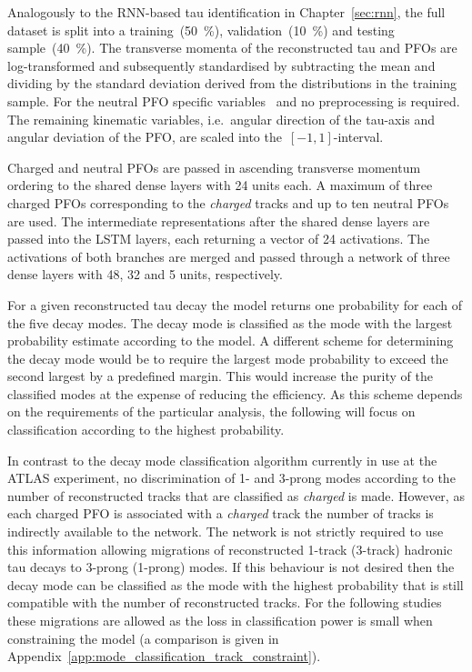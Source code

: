 Analogously to the RNN-based tau identification in Chapter~\ref{sec:rnn}, the
full dataset is split into a training~(\SI{50}{\percent}),
validation~(\SI{10}{\percent}) and testing sample~(\SI{40}{\percent}). The
transverse momenta of the reconstructed tau and PFOs are log-transformed and
subsequently standardised by subtracting the mean and dividing by the standard
deviation derived from the distributions in the training sample. For the neutral
PFO specific variables~ and
 no preprocessing is required. The remaining kinematic
variables, i.e.\ angular direction of the tau-axis and angular deviation of the
PFO, are scaled into the~$[-1, 1]$-interval.

Charged and neutral PFOs are passed in ascending transverse momentum ordering to
the shared dense layers with 24 units each. A maximum of three charged PFOs
corresponding to the \emph{charged} tracks and up to ten neutral PFOs are used.
The intermediate representations after the shared dense layers are passed into
the LSTM layers, each returning a vector of 24 activations. The activations of
both branches are merged and passed through a network of three dense layers with
48, 32 and 5 units, respectively.

For a given reconstructed tau decay the model returns one probability for each
of the five decay modes. The decay mode is classified as the mode with the
largest probability estimate according to the model. A different scheme for
determining the decay mode would be to require the largest mode probability to
exceed the second largest by a predefined margin. This would increase the purity
of the classified modes at the expense of reducing the efficiency. As this
scheme depends on the requirements of the particular analysis, the following
will focus on classification according to the highest probability.

In contrast to the decay mode classification algorithm currently in use at the
ATLAS experiment, no discrimination of 1- and 3-prong modes according to the
number of reconstructed tracks that are classified as \emph{charged} is made.
However, as each charged PFO is associated with a \emph{charged} track the
number of tracks is indirectly available to the network. The network is not
strictly required to use this information allowing migrations of reconstructed
1-track (3-track) hadronic tau decays to 3-prong (1-prong) modes. If this
behaviour is not desired then the decay mode can be classified as the mode with
the highest probability that is still compatible with the number of
reconstructed tracks. For the following studies these migrations are allowed as
the loss in classification power is small when constraining the model (a
comparison is given in Appendix~\ref{app:mode_classification_track_constraint}).


